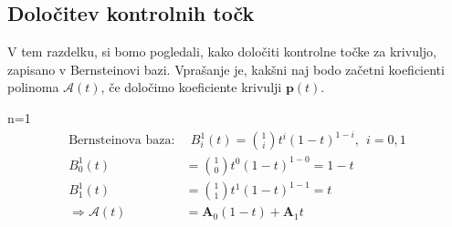 \documentclass[mat1]{fmfdelo}
\newcommand{\pp}{\boldsymbol p}
\newcommand{\A}{\mathcal A}
\begin{document}
\subsection{Določitev kontrolnih točk}
V tem razdelku, si bomo pogledali, kako določiti kontrolne točke za krivuljo, zapisano v Bernsteinovi bazi. Vprašanje je, kakšni naj bodo začetni koeficienti polinoma $\A(t)$, če določimo koeficiente krivulji $\pp(t)$. 
\begin{primer}
n=1
\begin{equation*}
\begin{split}
\text{Bernsteinova baza}:&~~ B_i^1(t) = \binom{1}{i} t^i(1-t)^{1-i}, ~~ i= 0,1 \\
B_0^1(t) &= \binom{1}{0} t^0(1-t)^{1-0} = 1-t \\
B_1^1(t) &= \binom{1}{1} t^1(1-t)^{1-1} = t \\
\Longrightarrow \A(t) &= \boldsymbol{A}_0(1-t) + \boldsymbol{A}_1t
\end{split}
\end{equation*}


\end{primer}
\end{document}
